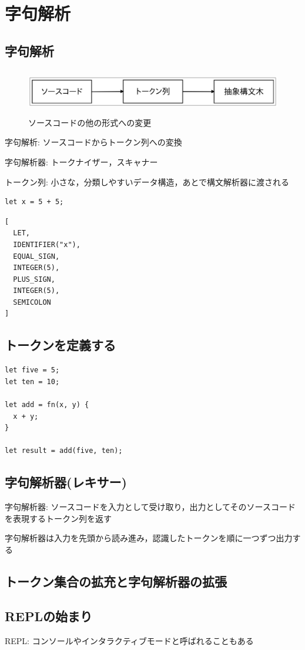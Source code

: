 \section{字句解析}
\subsection{字句解析}

\begin{figure}[H]
  \centering
  \includegraphics[height=2.0cm]{fig/fig1-1.png}
  \caption{ソースコードの他の形式への変更}
  \label{fig:1}
\end{figure}

字句解析: ソースコードからトークン列への変換

字句解析器: トークナイザー，スキャナー

トークン列: 小さな，分類しやすいデータ構造，あとで構文解析器に渡される

\begin{lstlisting}[caption=入力の例1]
let x = 5 + 5;
\end{lstlisting}

\begin{lstlisting}[caption=出力の例1]
[
  LET,
  IDENTIFIER("x"),
  EQUAL_SIGN,
  INTEGER(5),
  PLUS_SIGN,
  INTEGER(5),
  SEMICOLON
]
\end{lstlisting}

\subsection{トークンを定義する}

\begin{lstlisting}[caption=Monkey言語の例]
let five = 5;
let ten = 10;

let add = fn(x, y) {
  x + y;
}

let result = add(five, ten);
\end{lstlisting}

\subsection{字句解析器(レキサー)}

字句解析器: ソースコードを入力として受け取り，出力としてそのソースコードを表現するトークン列を返す

字句解析器は入力を先頭から読み進み，認識したトークンを順に一つずつ出力する

\subsection{トークン集合の拡充と字句解析器の拡張}

\subsection{REPLの始まり}

REPL: コンソールやインタラクティブモードと呼ばれることもある
